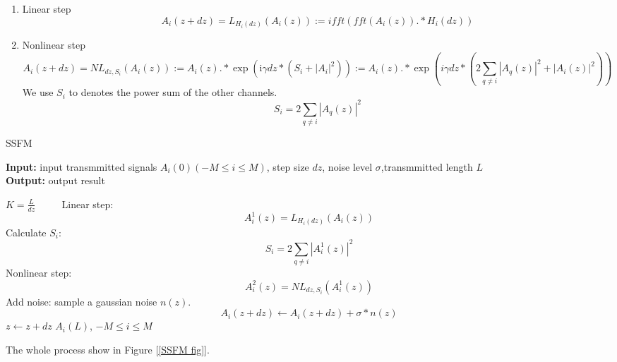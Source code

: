 \begin{enumerate}
\item Linear step
\begin{equation}\label{linear step}
A_i(z + dz) = L_{H_i(dz)}(A_i(z)) := ifft(fft(A_i(z)) .* H_i(dz))
\end{equation}
\item Nonlinear step
\begin{equation}\label{nonlinear step}
A_i(z+dz) = NL_{dz,S_i} (A_i(z)) := A_i(z) .* \exp\left(\mathrm{i} \gamma dz * (S_i+|A_i|^2)\right) := A_i(z) .* \exp\left(i \gamma dz * (2\sum_{q\neq i} |A_q(z)|^2+|A_i(z)|^2)\right)
\end{equation}
We use $S_i$ to denotes the power sum of the other channels.
\begin{equation}\label{define S}
S_i = 2\sum_{q\neq i} |A_q(z)|^2
\end{equation}
\end{enumerate}

\begin{algorithm}[t]
\caption{SSFM} %
\hspace*{0.02in} {\bf Input:} %
input transmmitted signals $A_i(0)(-M \leq i \leq M)$, step size $dz$, noise level $\sigma$,transmmitted length $L$\\
\hspace*{0.02in} {\bf Output:} %
output result
\begin{algorithmic}[1]
\State $K = \frac{L}{dz}$  %
　　 \State Linear step:
        $$
        A_i^{1}(z) = L_{H_i(dz)}(A_i(z))
        $$
    \State Calculate $S_i$:
        $$
        S_i = 2\sum_{q\neq i} |A_i^1(z)|^2
        $$
    \State Nonlinear step:
        $$
        A_i^2(z) = NL_{dz,S_i}(A^1_i(z))
        $$
    \State Add noise: sample a gaussian noise $n(z)$.
        $$
            A_i(z+dz) \leftarrow A_i(z+dz) + \sigma * n(z)
        $$
    \State $z \leftarrow z + dz$
\EndFor
\State \Return $A_i(L)$, $-M \leq i \leq M$
\end{algorithmic}
\end{algorithm}
The whole process show in Figure [\ref{SSFM fig}].

